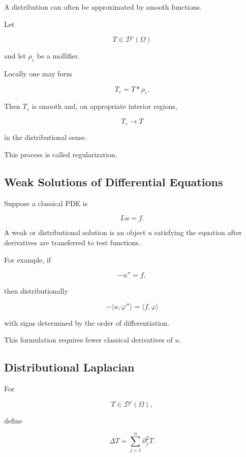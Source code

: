 A distribution can often be approximated by smooth functions.

Let

\[
T\in\mathcal{D}'(\Omega)
\]

and let \(\rho_\varepsilon\) be a mollifier.

Locally one may form

\[
\boxed{
T_\varepsilon
=
T*\rho_\varepsilon.
}
\]

Then \(T_\varepsilon\) is smooth and, on appropriate interior regions,

\[
\boxed{
T_\varepsilon\to T
}
\]

in the distributional sense.

This process is called regularization.

\subsection{Weak Solutions of Differential Equations}
\label{subsec:distribution-weak-solutions}

Suppose a classical PDE is

\[
Lu=f.
\]

A weak or distributional solution is an object \(u\) satisfying the
equation after derivatives are transferred to test functions.

For example, if

\[
-u''=f,
\]

then distributionally

\[
\boxed{
-\langle u,\varphi''\rangle
=
\langle f,\varphi\rangle
}
\]

with signs determined by the order of differentiation.

This formulation requires fewer classical derivatives of \(u\).

\subsection{Distributional Laplacian}
\label{subsec:distributional-laplacian}

For

\[
T\in\mathcal{D}'(\Omega),
\]

define

\[
\boxed{
\Delta T
=
\sum_{j=1}^{n}
\partial_j^2T.
}
\]

